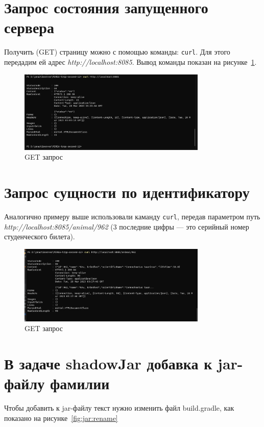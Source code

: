 \section{Запрос состояния запущенного сервера}
Получить (GET) страницу можно с помощью команды: \texttt{curl}.
Для этого передадим ей адрес \textit{http://localhost:8085}.
Вывод команды показан на рисунке~\ref{fig:curl}.

\begin{figure}[h!tp]
	\centering
	\includegraphics[width=0.8\textwidth]{png_5}
	\caption{GET запрос}
	\label{fig:curl}
\end{figure}

\section{Запрос сущности по идентификатору}
Аналогично примеру выше использовали каманду \texttt{curl},
передав параметром путь \textit{http://localhost:8085/animal/962}
(3 последние цифры --- это серийный номер студенческого билета).

\begin{figure}[h!tp]
	\centering
	\includegraphics[width=0.8\textwidth]{png_6}
	\caption{GET запрос}
	\label{fig:curl:d}
\end{figure}

\section{В задаче shadowJar добавка к jar-файлу фамилии}
Чтобы добавить к jar-файлу текст нужно изменить файл build.gradle, как
показано на рисунке~\ref{fig:jar:rename}

